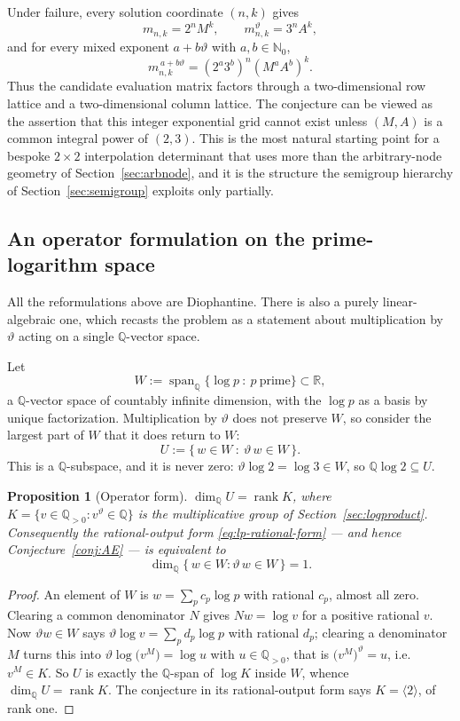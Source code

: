 \documentclass[11pt,oneside]{article}
\newtheorem{proposition}[theorem]{Proposition}
\theoremstyle{definition}
\theoremstyle{remark}
\newcommand{\Nzero}{\mathbb N_0}
\newcommand{\Q}{\mathbb Q}
\newcommand{\R}{\mathbb R}
\newcommand{\thetaq}{\vartheta}
\begin{document}
Under failure, every solution coordinate $(n,k)$ gives
\[
 m_{n,k}=2^nM^k,
 \qquad
 m_{n,k}^{\thetaq}=3^nA^k,
\]
and for every mixed exponent $a+b\thetaq$ with $a,b\in\Nzero$,
\begin{equation}
 m_{n,k}^{\,a+b\thetaq}
 =(2^a3^b)^n(M^aA^b)^k.
 \label{rf:eq:two-dimensional-grid}
\end{equation}
Thus the candidate evaluation matrix factors through a two-dimensional row lattice and a
two-dimensional column lattice.  The conjecture can be viewed as the assertion that this
integer exponential grid cannot exist unless $(M,A)$ is a common integral power of $(2,3)$.
This is the most natural starting point for a bespoke $2\times2$ interpolation determinant
that uses more than the arbitrary-node geometry of Section~\ref{sec:arbnode}, and it is the
structure the semigroup hierarchy of Section~\ref{sec:semigroup} exploits only partially.

\subsection{An operator formulation on the prime-logarithm space}
\label{rf:operator}

All the reformulations above are Diophantine.  There is also a purely linear-algebraic one,
which recasts the problem as a statement about multiplication by $\thetaq$ acting on a single
$\Q$-vector space.

Let
\[
  W:=\operatorname{span}_{\Q}\{\log p\ :\ p\ \text{prime}\}\subset\R ,
\]
a $\Q$-vector space of countably infinite dimension, with the $\log p$ as a basis by unique
factorization.  Multiplication by $\thetaq$ does not preserve $W$, so consider the largest
part of $W$ that it does return to $W$:
\[
  U:=\{\,w\in W\ :\ \thetaq\,w\in W\,\}.
\]
This is a $\Q$-subspace, and it is never zero: $\thetaq\log2=\log3\in W$, so
$\Q\log2\subseteq U$.

\begin{proposition}[Operator form]
\label{rf:prop-operator}
$\dim_{\Q}U=\operatorname{rank}K$, where
$K=\{v\in\Q_{>0}:v^{\thetaq}\in\Q\}$ is the multiplicative group of
Section~\ref{sec:logproduct}.  Consequently the rational-output form
\eqref{eq:lp-rational-form} --- and hence Conjecture~\ref{conj:AE} --- is equivalent to
\[
  \boxed{\ \dim_{\Q}\{\,w\in W:\thetaq\,w\in W\,\}=1 .\ }
\]
\end{proposition}

\begin{proof}
An element of $W$ is $w=\sum_pc_p\log p$ with rational $c_p$, almost all zero.  Clearing a
common denominator $N$ gives $Nw=\log v$ for a positive rational $v$.  Now $\thetaq w\in W$
says $\thetaq\log v=\sum_pd_p\log p$ with rational $d_p$; clearing a denominator $M$ turns
this into $\thetaq\log\bigl(v^{M}\bigr)=\log u$ with $u\in\Q_{>0}$, that is
$\bigl(v^{M}\bigr)^{\thetaq}=u$, i.e.\ $v^{M}\in K$.  So $U$ is exactly the $\Q$-span of
$\log K$ inside $W$, whence $\dim_{\Q}U=\operatorname{rank}K$.  The conjecture in its
rational-output form says $K=\langle2\rangle$, of rank one.
\end{proof}
\end{document}
